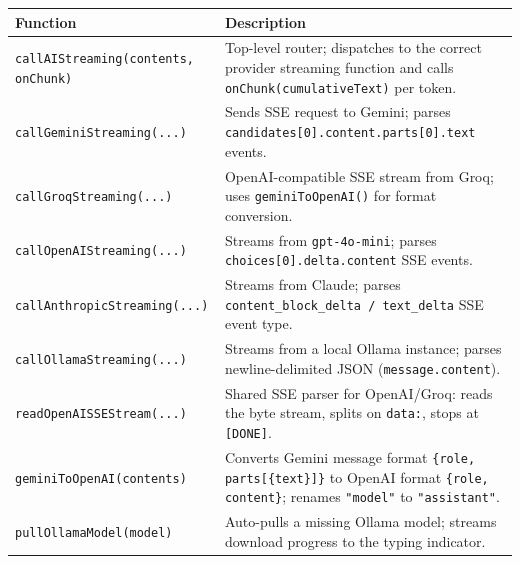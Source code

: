 \documentclass[11pt,a4paper]{article}
\begin{document}
\begin{longtable}{L{5.2cm} L{8.3cm}}
    \toprule
    \textbf{Function} & \textbf{Description} \\
    \midrule
    \endhead
    \bottomrule
    \endfoot

    \texttt{callAIStreaming(contents, onChunk)} &
        Top-level router; dispatches to the correct provider streaming function and calls \texttt{onChunk(cumulativeText)} per token. \\
    \addlinespace

    \texttt{callGeminiStreaming(...)} &
        Sends SSE request to Gemini; parses \texttt{candidates[0].content.parts[0].text} events. \\
    \addlinespace

    \texttt{callGroqStreaming(...)} &
        OpenAI-compatible SSE stream from Groq; uses \texttt{geminiToOpenAI()} for format conversion. \\
    \addlinespace

    \texttt{callOpenAIStreaming(...)} &
        Streams from \texttt{gpt-4o-mini}; parses \texttt{choices[0].delta.content} SSE events. \\
    \addlinespace

    \texttt{callAnthropicStreaming(...)} &
        Streams from Claude; parses \texttt{content\_block\_delta / text\_delta} SSE event type. \\
    \addlinespace

    \texttt{callOllamaStreaming(...)} &
        Streams from a local Ollama instance; parses newline-delimited JSON (\texttt{message.content}). \\
    \addlinespace

    \texttt{readOpenAISSEStream(...)} &
        Shared SSE parser for OpenAI/Groq: reads the byte stream, splits on \texttt{data:}, stops at \texttt{[DONE]}. \\
    \addlinespace

    \texttt{geminiToOpenAI(contents)} &
        Converts Gemini message format \texttt{\{role, parts[\{text\}]\}} to OpenAI format \texttt{\{role, content\}}; renames \texttt{"model"} to \texttt{"assistant"}. \\
    \addlinespace

    \texttt{pullOllamaModel(model)} &
        Auto-pulls a missing Ollama model; streams download progress to the typing indicator. \\
\end{longtable}
\end{document}
